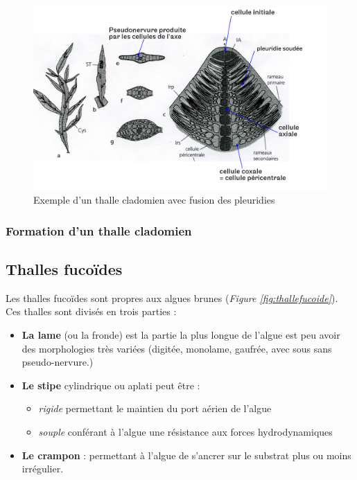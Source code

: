 \documentclass[
]{book}
\providecommand{\tightlist}{%
  \setlength{\itemsep}{0pt}\setlength{\parskip}{0pt}}
\begin{document}
\begin{figure}[H]

{\centering \includegraphics[width=0.7\linewidth]{./images/cladom3} 

}

\caption{Exemple d'un thalle cladomien avec fusion des pleuridies}\label{fig:cladom3}
\end{figure}

\hypertarget{formation-dun-thalle-cladomien}{%
\subsubsection{Formation d'un thalle cladomien}\label{formation-dun-thalle-cladomien}}

\hypertarget{thalles-fucouxefdes}{%
\subsection{Thalles fucoïdes}\label{thalles-fucouxefdes}}

Les thalles fucoïdes sont propres aux algues brunes (\emph{Figure \ref{fig:thallefucoide}}). Ces thalles sont divisés en trois parties :

\begin{itemize}
\item
  \textbf{La lame} (ou la fronde) est la partie la plus longue de l'algue est peu avoir des morphologies très variées (digitée, monolame, gaufrée, avec sous sans pseudo-nervure.)
\item
  \textbf{Le stipe} cylindrique ou aplati peut être :

  \begin{itemize}
  \tightlist
  \item
    \emph{rigide} permettant le maintien du port aérien de l'algue
  \item
    \emph{souple} conférant à l'algue une résistance aux forces hydrodynamiques
  \end{itemize}
\item
  \textbf{Le crampon} : permettant à l'algue de s'ancrer sur le substrat plus ou moins irrégulier.
\end{itemize}
\end{document}

